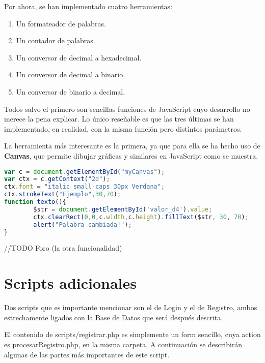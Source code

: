 \documentclass[12pt]{report}
\begin{document}
Por ahora, se han implementado cuatro herramientas:
\begin{enumerate}
    \item Un formateador de palabras.
    \item Un contador de palabras.
    \item Un conversor de decimal a hexadecimal.
    \item Un conversor de decimal a binario.
    \item Un conversor de binario a decimal.
\end{enumerate}
Todos salvo el primero son sencillas funciones de JavaScript cuyo desarrollo no merece la pena explicar. Lo único reseñable es que las tres últimas se han implementado, en realidad, con la misma función pero distintos parámetros.

La herramienta más interesante es la primera, ya que para ella se ha hecho uso de \textbf{Canvas}, que permite dibujar gráficas y similares en JavaScript como se muestra.

\begin{figure}[h]
    \qquad
    \label{fig:example}%
\end{figure}

\begin{lstlisting}[language=JavaScript]
var c = document.getElementById("myCanvas");
var ctx = c.getContext("2d");
ctx.font = "italic small-caps 30px Verdana";
ctx.strokeText("Ejemplo",30,70);
function texto(){
        $str = document.getElementById('valor_d4').value;
        ctx.clearRect(0,0,c.width,c.height).fillText($str, 30, 70);
        alert("Palabra cambiada!");
}
\end{lstlisting}

//TODO Foro (la otra funcionalidad)
 \newpage
\section{Scripts adicionales}
Dos scripts que es importante mencionar son el de Login y el de Registro, ambos estrechamente ligados con la Base de Datos que será después descrita. 

El contenido de scripts/registrar.php es simplemente un form sencillo, cuya action es procesarRegistro.php, en la misma carpeta. A continuación se describirán algunas de las partes más importantes de este script.
\end{document}
